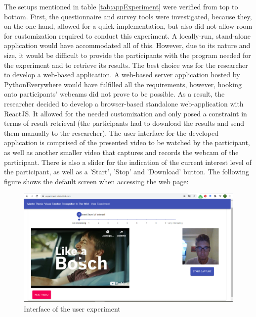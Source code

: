 The setups mentioned in table \ref{tab:appExperiment} were verified from top to bottom. First, the questionnaire and survey tools were investigated, because they, on the one hand, allowed for a quick implementation, but also did not allow room for customization required to conduct this experiment. A locally-run, stand-alone application would have accommodated all of this. However, due to its nature and size, it would be difficult to provide the participants with the program needed for the experiment and to retrieve its results. The best choice was for the researcher to develop a web-based application.
\newline\newline
A web-based server application hosted by PythonEverywhere would have fulfilled all the requirements, however, hooking onto participants’ webcams did not prove to be possible. As a result, the researcher decided to develop a browser-based standalone web-application with ReactJS. It allowed for the needed customization and only posed a constraint in terms of result retrieval (the participants had to download the results and send them manually to the researcher).
\newline\newline
The user interface for the developed application is comprised of the presented video to be watched by the participant, as well as another smaller video that captures and records the webcam of the participant. There is also a slider for the indication of the current interest level of the participant, as well as a 'Start', 'Stop' and 'Download' button. The following figure shows the default screen when accessing the web page:

\begin{center}
\begin{figure}[H]
  \begin{center}
  \includegraphics[angle=0, width=1.0\textwidth]{Figures/UserExperiment.PNG}
  \caption{Interface of the user experiment}
  \label{fig:InterfaceUserExperiment}
  \end{center}
\end{figure}
\end{center}

